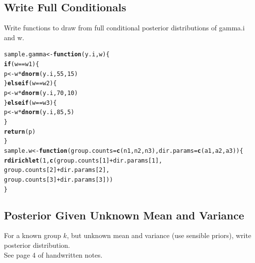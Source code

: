 \documentclass[12pt,letterpaper]{article}\usepackage[]{graphicx}\usepackage[]{color}
\makeatletter
\newcommand{\hlnum}[1]{\textcolor[rgb]{0.686,0.059,0.569}{#1}}%
\newcommand{\hlopt}[1]{\textcolor[rgb]{0,0,0}{#1}}%
\newcommand{\hlstd}[1]{\textcolor[rgb]{0.345,0.345,0.345}{#1}}%
\newcommand{\hlkwa}[1]{\textcolor[rgb]{0.161,0.373,0.58}{\textbf{#1}}}%
\newcommand{\hlkwb}[1]{\textcolor[rgb]{0.69,0.353,0.396}{#1}}%
\newcommand{\hlkwc}[1]{\textcolor[rgb]{0.333,0.667,0.333}{#1}}%
\newcommand{\hlkwd}[1]{\textcolor[rgb]{0.737,0.353,0.396}{\textbf{#1}}}%
\newenvironment{kframe}{%
 \def\at@end@of@kframe{}%
 \ifinner\ifhmode%
  \def\at@end@of@kframe{\end{minipage}}%
  \begin{minipage}{\columnwidth}%
 \fi\fi%
 \def\FrameCommand##1{\hskip\@totalleftmargin \hskip-\fboxsep
 \colorbox{shadecolor}{##1}\hskip-\fboxsep
     \hskip-\linewidth \hskip-\@totalleftmargin \hskip\columnwidth}%
 \MakeFramed {\advance\hsize-\width
   \@totalleftmargin\z@ \linewidth\hsize
   \@setminipage}}%
 {\par\unskip\endMakeFramed%
 \at@end@of@kframe}
\newenvironment{knitrout}{}{} %
\makeatother
\begin{document}
\subsection{Write Full Conditionals}
Write functions to draw from full conditional posterior distributions of
gamma.i and w.
\begin{knitrout}
\color{fgcolor}\begin{kframe}
\begin{alltt}
\hlstd{sample.gamma} \hlkwb{<-} \hlkwa{function}\hlstd{(}\hlkwc{y.i}\hlstd{,} \hlkwc{w}\hlstd{) \{}
  \hlkwa{if} \hlstd{(w}\hlopt{==}\hlstd{w1) \{}
    \hlstd{p} \hlkwb{<-} \hlstd{w}\hlopt{*}\hlkwd{dnorm}\hlstd{(y.i,} \hlnum{55}\hlstd{,} \hlnum{15}\hlstd{)}
  \hlstd{\}} \hlkwa{else if} \hlstd{(w}\hlopt{==}\hlstd{w2) \{}
    \hlstd{p} \hlkwb{<-} \hlstd{w}\hlopt{*}\hlkwd{dnorm}\hlstd{(y.i,} \hlnum{70}\hlstd{,} \hlnum{10}\hlstd{)}
  \hlstd{\}} \hlkwa{else if} \hlstd{(w}\hlopt{==}\hlstd{w3) \{}
    \hlstd{p} \hlkwb{<-} \hlstd{w}\hlopt{*}\hlkwd{dnorm}\hlstd{(y.i,} \hlnum{85}\hlstd{,} \hlnum{5}\hlstd{)}
  \hlstd{\}}
  \hlkwd{return} \hlstd{(p)}
\hlstd{\}}
\hlstd{sample.w} \hlkwb{<-} \hlkwa{function}\hlstd{(}\hlkwc{group.counts}\hlstd{=}\hlkwd{c}\hlstd{(n1, n2, n3),} \hlkwc{dir.params}\hlstd{=}\hlkwd{c}\hlstd{(a1, a2, a3)) \{}
  \hlkwd{rdirichlet}\hlstd{(}\hlnum{1}\hlstd{,} \hlkwd{c}\hlstd{(group.counts[}\hlnum{1}\hlstd{]}\hlopt{+}\hlstd{dir.params[}\hlnum{1}\hlstd{],}
                  \hlstd{group.counts[}\hlnum{2}\hlstd{]}\hlopt{+}\hlstd{dir.params[}\hlnum{2}\hlstd{],}
                  \hlstd{group.counts[}\hlnum{3}\hlstd{]}\hlopt{+}\hlstd{dir.params[}\hlnum{3}\hlstd{]))}
\hlstd{\}}
\end{alltt}
\end{kframe}
\end{knitrout}

\subsection{Posterior Given Unknown Mean and Variance}
For a known group $k$, but unknown mean and variance (use sensible priors),
write posterior distribution.\\ 
See page 4 of handwritten notes.\\
\end{document}
